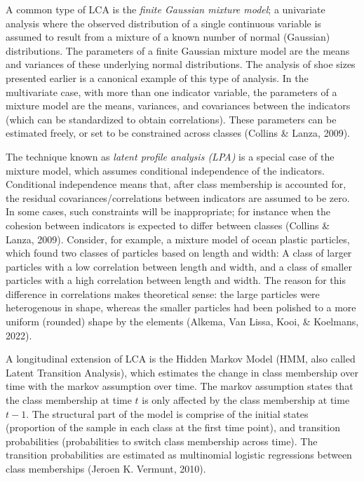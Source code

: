 \documentclass[
  ,man,floatsintext]{apa6}
\begin{document}
A common type of LCA is the \emph{finite Gaussian mixture model}; a
univariate analysis where the observed distribution of a single
continuous variable is assumed to result from a mixture of a known
number of normal (Gaussian) distributions. The parameters of a finite
Gaussian mixture model are the means and variances of these underlying
normal distributions. The analysis of shoe sizes presented earlier is a
canonical example of this type of analysis. In the multivariate case,
with more than one indicator variable, the parameters of a mixture model
are the means, variances, and covariances between the indicators (which
can be standardized to obtain correlations). These parameters can be
estimated freely, or set to be constrained across classes
(Collins \& Lanza, 2009).

The technique known as \emph{latent profile analysis (LPA)} is a special case
of the mixture model, which assumes conditional independence of the
indicators. Conditional independence means that, after class membership
is accounted for, the residual covariances/correlations between
indicators are assumed to be zero. In some cases, such constraints will
be inappropriate; for instance when the cohesion between indicators is
expected to differ between classes (Collins \& Lanza, 2009). Consider, for
example, a mixture model of ocean plastic particles, which found two
classes of particles based on length and width: A class of larger
particles with a low correlation between length and width, and a class
of smaller particles with a high correlation between length and width.
The reason for this difference in correlations makes theoretical sense:
the large particles were heterogenous in shape, whereas the smaller
particles had been polished to a more uniform (rounded) shape by the
elements (Alkema, Van Lissa, Kooi, \& Koelmans, 2022).

A longitudinal extension of LCA is the Hidden Markov Model (HMM, also
called Latent Transition Analysis), which estimates the change in class
membership over time with the markov assumption over time. The markov
assumption states that the class membership at time \(t\) is only affected
by the class membership at time \(t-1\). The structural part of the model
is comprise of the initial states (proportion of the sample in each
class at the first time point), and transition probabilities
(probabilities to switch class membership across time). The transition
probabilities are estimated as multinomial logistic regressions between
class memberships (Jeroen K. Vermunt, 2010).
\end{document}
